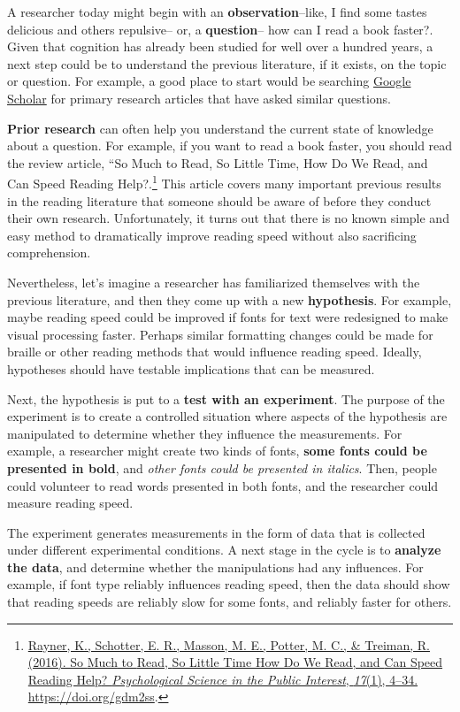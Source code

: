 \documentclass[
  oneside,
  12pt]{crumpbook}
\begin{document}
A researcher today might begin with an \textbf{observation}--like, I find some tastes delicious and others repulsive-- or, a \textbf{question}-- how can I read a book faster?. Given that cognition has already been studied for well over a hundred years, a next step could be to understand the previous literature, if it exists, on the topic or question. For example, a good place to start would be searching \href{https://scholar.google.com}{Google Scholar} for primary research articles that have asked similar questions.

\textbf{Prior research} can often help you understand the current state of knowledge about a question. For example, if you want to read a book faster, you should read the review article, ``So Much to Read, So Little Time, How Do We Read, and Can Speed Reading Help?.\footnote{\protect\hyperlink{ref-raynerMuchReadLittle2016}{Rayner, K., Schotter, E. R., Masson, M. E., Potter, M. C., \& Treiman, R. (2016). So {Much} to {Read}, {So Little Time How Do We Read}, and {Can Speed Reading Help}? \emph{Psychological Science in the Public Interest}, \emph{17}(1), 4--34. \url{https://doi.org/gdm2ss}}.} This article covers many important previous results in the reading literature that someone should be aware of before they conduct their own research. Unfortunately, it turns out that there is no known simple and easy method to dramatically improve reading speed without also sacrificing comprehension.

Nevertheless, let's imagine a researcher has familiarized themselves with the previous literature, and then they come up with a new \textbf{hypothesis}. For example, maybe reading speed could be improved if fonts for text were redesigned to make visual processing faster. Perhaps similar formatting changes could be made for braille or other reading methods that would influence reading speed. Ideally, hypotheses should have testable implications that can be measured.

Next, the hypothesis is put to a \textbf{test with an experiment}. The purpose of the experiment is to create a controlled situation where aspects of the hypothesis are manipulated to determine whether they influence the measurements. For example, a researcher might create two kinds of fonts, \textbf{some fonts could be presented in bold}, and \emph{other fonts could be presented in italics}. Then, people could volunteer to read words presented in both fonts, and the researcher could measure reading speed.

The experiment generates measurements in the form of data that is collected under different experimental conditions. A next stage in the cycle is to \textbf{analyze the data}, and determine whether the manipulations had any influences. For example, if font type reliably influences reading speed, then the data should show that reading speeds are reliably slow for some fonts, and reliably faster for others.
\end{document}
